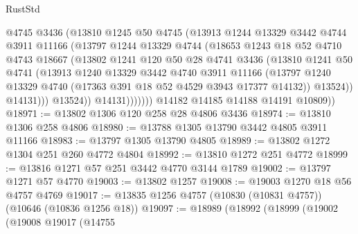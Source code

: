 \begin{lexlean}{RustStd}
\begin{coremodule}
                      @4745
                      @3436
                      (@13810
                        @1245
                        @50
                        @4745
                        (@13913
                          @1244
                          @13329
                          @3442
                          @4744
                          @3911
                          @11166
                          (@13797
                            @1244
                            @13329
                            @4744
                            (@18653
                              @1243
                              @18
                              @52
                              @4710
                              @4743
                              @18667
                              (@13802
                                @1241
                                @120
                                @50
                                @28
                                @4741
                                @3436
                                (@13810
                                  @1241
                                  @50
                                  @4741
                                  (@13913
                                    @1240
                                    @13329
                                    @3442
                                    @4740
                                    @3911
                                    @11166
                                    (@13797
                                      @1240
                                      @13329
                                      @4740
                                      (@17363 @391 @18 @52 @4529 @3943 @17377 @14132))
                                    @13524))
                                @14131)))
                          @13524))
                      @14131)))))))
        @14182
        @14185
        @14188
        @14191
        @10809))
@18971 := @13802 @1306 @120 @258 @28 @4806 @3436
@18974 := @13810 @1306 @258 @4806
@18980 := @13788 @1305 @13790 @3442 @4805 @3911 @11166
@18983 := @13797 @1305 @13790 @4805
@18989 := @13802 @1272 @1304 @251 @260 @4772 @4804
@18992 := @13810 @1272 @251 @4772
@18999 := @13816 @1271 @57 @251 @3442 @4770 @3144 @1789
@19002 := @13797 @1271 @57 @4770
@19003 := @13802 @1257
@19008 := @19003 @1270 @18 @56 @4757 @4769
@19017 := @13835 @1256 @4757 (@10830 (@10831 @4757)) (@10646 (@10836 @1256 @18))
@19097 := @18989
    (@18992
      (@18999
        (@19002
          (@19008
            @19017
            (@14755

\end{coremodule}
\end{lexlean}
